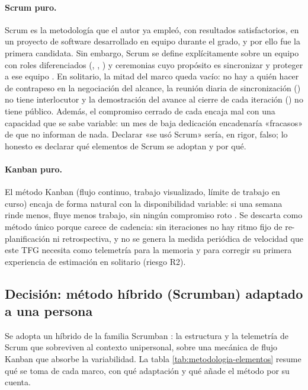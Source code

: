 \paragraph{Scrum puro.}
Scrum es la metodología que el autor ya empleó, con resultados satisfactorios, en un proyecto de software desarrollado en equipo durante el grado, y por ello fue la primera candidata.
Sin embargo, Scrum se define explícitamente sobre un equipo con roles diferenciados (, , ) y ceremonias cuyo propósito es sincronizar y proteger a ese equipo \parencite{scrum-guide}.
En solitario, la mitad del marco queda vacío: no hay a quién hacer de contrapeso en la negociación del alcance, la reunión diaria de sincronización () no tiene interlocutor y la demostración del avance al cierre de cada iteración () no tiene público.
Además, el compromiso cerrado de cada  encaja mal con una capacidad que se sabe variable: un mes de baja dedicación encadenaría «fracasos» de  que no informan de nada.
Declarar «se usó Scrum» sería, en rigor, falso; lo honesto es declarar qué elementos de Scrum se adoptan y por qué.

\paragraph{Kanban puro.}
El método Kanban (flujo continuo, trabajo visualizado, límite de trabajo en curso) encaja de forma natural con la disponibilidad variable: si una semana rinde menos, fluye menos trabajo, sin ningún compromiso roto \parencite{anderson-kanban}.
Se descarta como método único porque carece de cadencia: sin iteraciones no hay ritmo fijo de re-planificación ni retrospectiva, y no se genera la medida periódica de velocidad que este \ac{TFG} necesita como telemetría para la memoria y para corregir su primera experiencia de estimación en solitario (riesgo R2).

\subsection{Decisión: método híbrido (Scrumban) adaptado a una persona}
\label{sec:metodologia-decision}

Se adopta un híbrido de la familia Scrumban \parencite{ladas-scrumban, kniberg-scrumban}: la estructura y la telemetría de Scrum que sobreviven al contexto unipersonal, sobre una mecánica de flujo Kanban que absorbe la variabilidad.
La tabla \ref{tab:metodologia-elementos} resume qué se toma de cada marco, con qué adaptación y qué añade el método por su cuenta.

